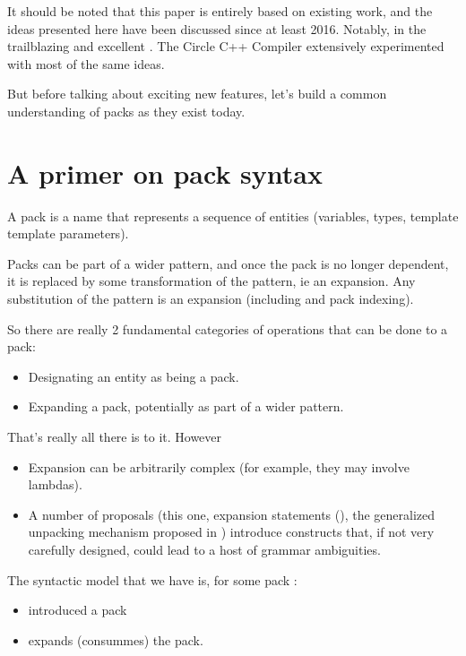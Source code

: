 \documentclass{wg21}
\begin{document}
It should be noted that this paper is entirely based on existing work, and the ideas presented here have been discussed since at least 2016.
Notably, in the trailblazing  and excellent .
The Circle C++ Compiler extensively experimented with most of the same ideas.

But before talking about exciting new features, let's build a common understanding of packs as they exist today.

\section{A primer on pack syntax}

A pack is a name that represents a sequence of entities (variables, types, template template parameters).

Packs can be part of a wider pattern, and once the pack is no longer dependent, it is replaced by some transformation of the pattern, ie an expansion.
Any substitution of the pattern is an expansion (including  and pack indexing).

So there are really 2 fundamental categories of operations that can be done to a pack:
\begin{itemize}
\item Designating an entity as being a pack.
\item Expanding a pack, potentially as part of a wider pattern.
\end{itemize}

That's really all there is to it.  However
\begin{itemize}
\item Expansion can be arbitrarily complex (for example, they may involve lambdas).
\item A number of proposals (this one, expansion statements (), the generalized unpacking mechanism proposed in ) introduce
constructs that, if not very carefully designed, could lead to a host of grammar ambiguities.
\end{itemize}

The syntactic model that we have is, for some pack :

\begin{itemize}
\item {} introduced a pack
\item {} expands (consummes) the pack.
\end{itemize}
\end{document}
